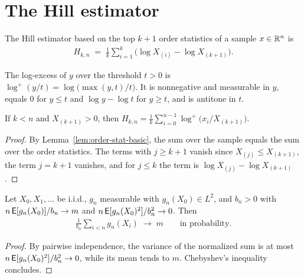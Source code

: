 \section{The Hill estimator}

\begin{definition}
  \label{def:hill}
  \leanok
  The Hill estimator based on the top $k + 1$ order statistics of a sample $x \in \mathbb{R}^n$ is
  \begin{align*}
    H_{k,n} \; = \; \frac{1}{k} \sum_{i=1}^{k} \big( \log X_{(i)} - \log X_{(k+1)} \big) .
  \end{align*}
\end{definition}

\begin{definition}
  \label{def:log-excess}
  \leanok
  The log-excess of $y$ over the threshold $t > 0$ is
  $\log^+(y/t) = \log\big( \max(y, t)/t \big)$. It is nonnegative and measurable in $y$, equals $0$
  for $y \le t$ and $\log y - \log t$ for $y \ge t$, and is antitone in $t$.
\end{definition}

\begin{lemma}
  \label{lem:hill-log-excess}
  \leanok
  If $k < n$ and $X_{(k+1)} > 0$, then
  $H_{k,n} = \frac{1}{k} \sum_{i=0}^{n-1} \log^+ \big( x_i / X_{(k+1)} \big)$.
\end{lemma}
\begin{proof}
  \leanok
  By Lemma~\ref{lem:order-stat-basic}, the sum over the sample equals the sum over the order
  statistics. The terms with $j \ge k + 1$ vanish since $X_{(j)} \le X_{(k+1)}$, the term $j = k + 1$
  vanishes, and for $j \le k$ the term is $\log X_{(j)} - \log X_{(k+1)}$.
\end{proof}

\begin{lemma}
  \label{lem:chebyshev-wlln}
  \leanok
  Let $X_0, X_1, \ldots$ be i.i.d., $g_n$ measurable with $g_n(X_0) \in L^2$, and $b_n > 0$ with
  $n \, \mathsf{E}[g_n(X_0)]/b_n \to m$ and $n \, \mathsf{E}[g_n(X_0)^2]/b_n^2 \to 0$. Then
  \begin{align*}
    \frac{1}{b_n} \sum_{i<n} g_n(X_i) \; \to \; m \qquad \text{in probability.}
  \end{align*}
\end{lemma}
\begin{proof}
  \leanok
  By pairwise independence, the variance of the normalized sum is at most
  $n \, \mathsf{E}[g_n(X_0)^2]/b_n^2 \to 0$, while its mean tends to $m$. Chebyshev's inequality
  concludes.
\end{proof}

